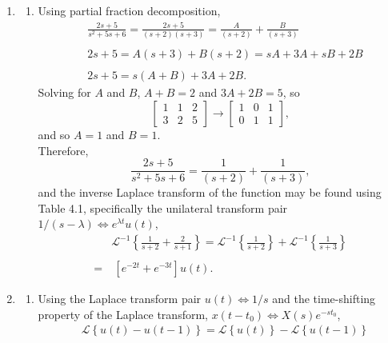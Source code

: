 \documentclass{article}
\begin{document}
\begin{enumerate}[label=\thesubsubsection]
\begin{enumerate}[label=\alph*)]
	\end{enumerate}
	\setcounter{subsubsection}{4}
	\item
		\begin{enumerate}[label=\alph*)]
			\item Using partial fraction decomposition, 
				\begin{align*}
				 &\frac{2s+5}{s^2+5s+6} = \frac{2s+5}{(s+2)(s+3)} = \frac{A}{(s+2)}+\frac{B}{(s+3)} \\ \\
				 &2s+5 = A(s+3) + B(s+2) = sA + 3A +sB + 2B \\ \\
				 &2s+5 = s(A+B) +3A + 2B.
				\end{align*}
				Solving for \(A\) and \(B\), \(A+B = 2\) and \(3A + 2B = 5\), so
				\[
					\begin{bmatrix}
						1 & 1 & 2 \\ 3 & 2 & 5
					\end{bmatrix} \to 
					\begin{bmatrix}
						1 & 0 & 1 \\ 0 & 1 & 1
					\end{bmatrix},
				\]
				and so \(A = 1\) and \(B=1\).
				\\[10pt]
				Therefore, 
		\[
		  \frac{2s+5}{s^2+5s+6} = \frac{1}{(s+2)} + \frac{1}{(s+3)},
		\]
		and the inverse Laplace transform of the function may be found using Table 4.1, specifically the unilateral transform pair \(1/(s-\lambda) \Leftrightarrow e^{\lambda t}u(t)\),
		\begin{align*}
			&\mathcal{L}^{-1}\left\{\frac{1}{s+2} + \frac{2}{s+1}\right\} = \mathcal{L}^{-1}\left\{\frac{1}{s+2}\right\} + \mathcal{L}^{-1}\left\{\frac{1}{s+3}\right\} \\ \\
			=& \ [e^{-2t} + e^{-3t}]u(t).
		\end{align*}
  \end{enumerate}
	\setcounter{subsection}{2}
	\setcounter{subsubsection}{2}
	\item
		\begin{enumerate}[label=\alph*)]
			\item Using the Laplace transform pair \(u(t) \Leftrightarrow 1/s\) and the time-shifting property of the Laplace transform, \(x(t-t_0) \Leftrightarrow X(s)e^{-st_0}\),
				\begin{align*}
					&\mathcal{L}\left\{u(t) - u(t-1)\right\} = \mathcal{L}\left\{u(t)\right\} - \mathcal{L}\left\{u(t-1)\right\} \\

\end{align*}
\end{enumerate}
\end{enumerate}
\end{document}
